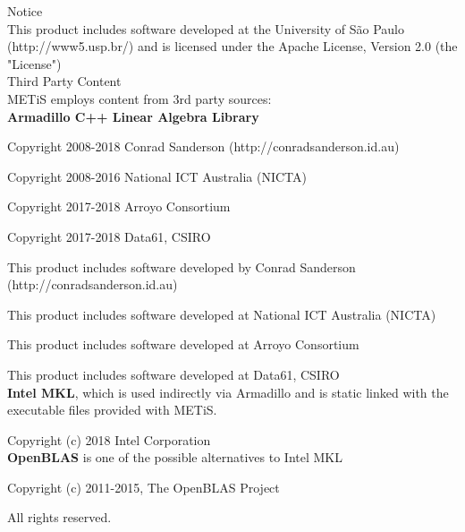 {\selectfont \LARGE Notice} \\[8pt]
%
This product includes software developed at the University of São Paulo (http://www5.usp.br/) and is licensed under the Apache License, Version 2.0 (the "License") \\[24pt]




{ \selectfont\LARGE Third Party Content} \\[8pt]
METiS employs content from 3rd party sources: \\[16pt]
%
\textbf{Armadillo C++ Linear Algebra Library}

Copyright 2008-2018 Conrad Sanderson (http://conradsanderson.id.au)

Copyright 2008-2016 National ICT Australia (NICTA)

Copyright 2017-2018 Arroyo Consortium

Copyright 2017-2018 Data61, CSIRO

This product includes software developed by Conrad Sanderson 
(http://conradsanderson.id.au)

This product includes software developed at National ICT Australia (NICTA)

This product includes software developed at Arroyo Consortium

This product includes software developed at Data61, CSIRO \\[24pt]
%
%
%
\textbf{Intel MKL}, which is used indirectly via Armadillo and is static linked with the executable files provided with METiS.

Copyright (c) 2018 Intel Corporation\\[24pt]
%
%
%
\textbf{OpenBLAS} is one of the possible alternatives to Intel MKL

Copyright (c) 2011-2015, The OpenBLAS Project 

All rights reserved.
